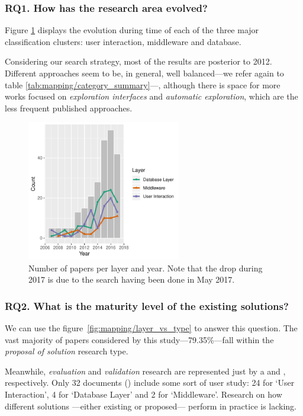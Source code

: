 \subsubsection{RQ1. How has the research area evolved?}
Figure \ref{fig:mapping/layers_histogram} displays the evolution during time
of each of the three major classification clusters: user interaction,
middleware and database.

Considering our search strategy, most of the
results are posterior to 2012. Different approaches seem to be, in general, well
balanced---we refer again to table \ref{tab:mapping/category_summary}---, although there
is space for more works focused on \emph{exploration interfaces} and
\emph{automatic exploration}, which are the less frequent published approaches.

\begin{figure}[hptb]
    \centering
    \includegraphics[width=0.6\textwidth]{images/2_mapping/layer_histogram}
    \caption{
        Number of papers per layer and year.
        Note that the drop during 2017 is due to the search having been done in May 2017.
    }
    \label{fig:mapping/layers_histogram}
\end{figure}

\subsubsection{RQ2. What is the maturity level of the existing solutions?}
We can use the figure~\ref{fig:mapping/layer_vs_type} to answer this question.
The vast majority of papers considered by this study---79.35\%---fall within the
\emph{proposal of solution} research type.

Meanwhile, \emph{evaluation} and \emph{validation} research are represented
just by a  and , respectively.
Only 32 documents () include some sort of user study:
24 for `User Interaction', 4 for `Database  Layer' and 2 for `Middleware'.
Research on how different solutions ---either existing or proposed--- perform in
practice is lacking.

